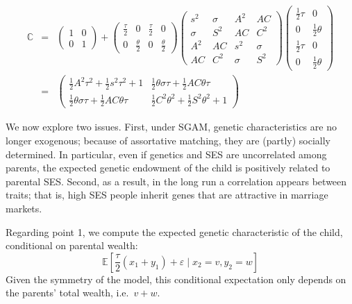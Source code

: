 \documentclass[
]{article}
\theoremstyle{definition}
\theoremstyle{definition}
\theoremstyle{definition}
\theoremstyle{definition}
\theoremstyle{remark}
\begin{document}
\begin{eqnarray}
\mathbb{C} &=&\left( 
\begin{array}{cc}
1 & 0 \\ 
0 & 1%
\end{array}%
\right) +\left( 
\begin{array}{cccc}
\frac{\tau }{2} & 0 & \frac{\tau }{2} & 0 \\ 
0 & \frac{\theta }{2} & 0 & \frac{\theta }{2}%
\end{array}%
\right) \allowbreak \left( 
\begin{array}{cccc}
s^{2} & \sigma  & A^{2} & AC \\ 
\sigma  & S^{2} & AC & C^{2} \\ 
A^{2} & AC & s^{2} & \sigma  \\ 
AC & C^{2} & \sigma  & S^{2}%
\end{array}%
\right) \allowbreak \left( 
\begin{array}{cc}
\frac{1}{2}\tau  & 0 \\ 
0 & \frac{1}{2}\theta  \\ 
\frac{1}{2}\tau  & 0 \\ 
0 & \frac{1}{2}\theta 
\end{array}%
\right) \nonumber \\
&=&\left( 
\begin{array}{cc}
\frac{1}{2}A^{2}\tau ^{2}+\frac{1}{2}s^{2}\tau ^{2}+1 & \frac{1}{2}\theta
\sigma \tau +\frac{1}{2}AC\theta \tau  \\ 
\frac{1}{2}\theta \sigma \tau +\frac{1}{2}AC\theta \tau  & \frac{1}{2}%
C^{2}\theta ^{2}+\frac{1}{2}S^{2}\theta ^{2}+1%
\end{array}%
\right) \allowbreak \label{cov-children-SGAM}
\end{eqnarray}
\newline

We now explore two issues. First, under SGAM, genetic characteristics are no
longer exogenous; because of assortative matching, they are (partly) socially
determined. In particular, even if genetics and SES are uncorrelated among
parents, the expected genetic endowment of the child is positively related to
parental SES. Second, as a result, in the long run a correlation appears between
traits; that is, high SES people inherit genes that are attractive in marriage
markets.

Regarding point 1, we compute the expected genetic characteristic of the
child, conditional on parental wealth:
\[
\mathbb{E}\left[ \frac{\tau }{2}\left( x_{1}+y_{1}\right) +\varepsilon \mid
x_{2}=v,y_{2}=w\right] 
\]
Given the symmetry of the model, this conditional
expectation only depends on the parents' total wealth, i.e.~\(v+w\).
\end{document}

